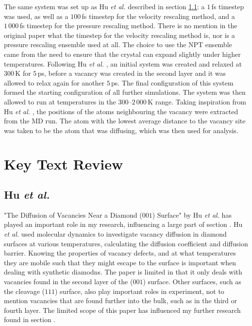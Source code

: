 \documentclass[10pt,a4paper,twocolumn,twoside]{extarticle}
\newcommand{\al}{\emph{et al. }}
\begin{document}
The same system was set up as Hu \al described in section \ref{Hu}: a $1$\,fs timestep was used, as well as a $100$\,fs timestep for the velocity rescaling method, and a $1\,000$\,fs timestep for the pressure rescaling method. There is no mention in the original paper what the timestep for the velocity rescaling method is, nor is a pressure rescaling ensemble used at all. The choice to use the NPT ensemble came from the need to ensure that the crystal can expand slightly under higher temperatures. Following Hu \al, an initial system was created and relaxed at $300$\,K for $5$\,ps, before a vacancy was created in the second layer and it was allowed to relax again for another $5$\,ps. The final configuration of this system formed the starting configuration of all further simulations. The system was then allowed to run at temperatures in the $300$--$2\,000$\,K range. Taking inspiration from Hu \al, the positions of the atoms neighbouring the vacancy were extracted from the MD run. The atom with the lowest average distance to the vacancy site was taken to be the atom that was diffusing, which was then used for analysis. 



\section{Key Text Review}
\subsection{Hu \al}
\label{Hu}
"The Diffusion of Vacancies Near a Diamond ($001$) Surface" by Hu \al has played an important role in my research, influencing a large part of section . Hu \al used molecular dynamics to investigate vacancy diffusion in diamond surfaces at various temperatures, calculating the diffusion coefficient and diffusion barrier. Knowing the properties of vacancy defects, and at what temperatures they are mobile such that they might escape to the surface is important when dealing with synthetic diamodns. The paper is limited in that it only deals with vacancies found in the second layer of the ($001$) surface. Other surfaces, such as the cleavage ($111$) surface, also play important roles in experiment, not to mention vacancies that are found further into the bulk, such as in the third or fourth layer. The limited scope of this paper has influenced my further research found in section .
\end{document}
